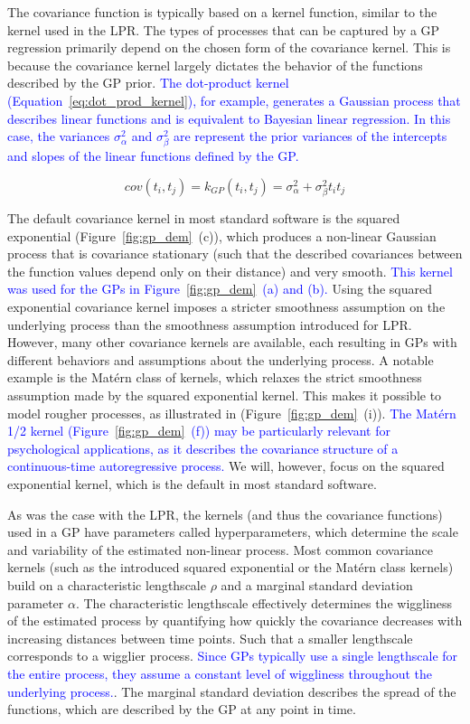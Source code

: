 \documentclass[man, floatsintext]{apa7}
\begin{document}
The covariance function is typically based on a kernel function, similar to the
kernel used in the LPR\@. The types of processes that can be captured by a GP
regression primarily depend on the chosen form of the covariance kernel. This
is because the covariance kernel largely dictates the behavior of the functions
described by the GP prior\@. \textcolor{blue}{The dot-product kernel
  (Equation~\ref{eq:dot_prod_kernel}), for example, generates a Gaussian
  process
  that describes linear functions and is equivalent to Bayesian linear
  regression. In this case, the variances $\sigma_\alpha^2$ and
  $\sigma_\beta^2$
  are represent the prior variances of the intercepts and slopes of the linear
  functions defined by the GP\@.}

\begin{equation}\label{eq:dot_prod_kernel}
  cov(t_i, t_j) = k_{GP}(t_i, t_j) = \sigma_\alpha^2 + \sigma_\beta^2 t_i t_j
\end{equation}

The default covariance kernel in most standard software is the
squared exponential (Figure~\ref{fig:gp_dem}~(c)), which produces a
non-linear Gaussian process that is covariance stationary (such that the
described covariances between the function values depend only on their
distance) and very smooth. \textcolor{blue}{This kernel was used for the GPs
  in Figure~\ref{fig:gp_dem}~(a) and (b). } Using the squared exponential
covariance kernel imposes a stricter smoothness assumption on the underlying
process than the smoothness assumption introduced for LPR\@. However, many
other covariance kernels are available, each resulting in GPs with different
behaviors and assumptions about the underlying process. A notable example is
the Matérn class of kernels, which relaxes the strict smoothness assumption
made by the squared exponential kernel. This makes it possible to model
rougher processes, as illustrated in (Figure~\ref{fig:gp_dem}~(i)).
\textcolor{blue}{The Matérn 1/2 kernel (Figure~\ref{fig:gp_dem}~(f)) may be
  particularly relevant for psychological applications, as it describes the
  covariance structure of a continuous-time autoregressive process.} We will,
however, focus on the squared exponential kernel, which is the default in most
standard software.

As was the case with the LPR, the kernels (and thus the covariance functions)
used in a GP have parameters called hyperparameters, which determine the scale
and variability of the estimated non-linear process. Most common covariance
kernels (such as the introduced squared exponential or the Matérn class
kernels) build on a characteristic lengthscale $\rho$ and a marginal standard
deviation parameter $\alpha$. The characteristic lengthscale effectively
determines the wiggliness of the estimated process by quantifying how quickly
the covariance decreases with increasing distances between time points. Such
that a smaller lengthscale corresponds to a wigglier process.
\textcolor{blue}{Since GPs typically use a single lengthscale for the entire
  process, they assume a constant level of wiggliness throughout
  the underlying process.}.
The marginal standard deviation describes the spread of the functions, which
are described by the GP at any point in time.
\end{document}
